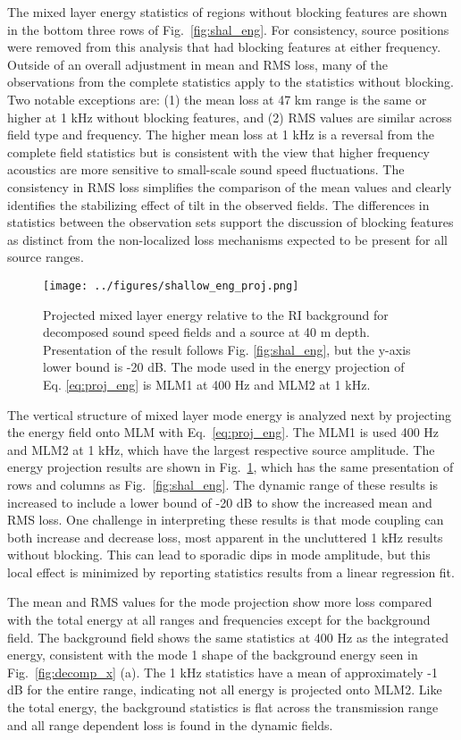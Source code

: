 \documentclass[preprint,NumberedRefs]{JASA}
\begin{document}
The mixed layer energy statistics of regions without blocking features are shown in the bottom three rows of Fig.~\ref{fig:shal_eng}. For consistency, source positions were removed from this analysis that had blocking features at either frequency. Outside of an overall adjustment in mean and RMS loss, many of the observations from the complete statistics apply to the statistics without blocking. Two notable exceptions are: (1) the mean loss at 47 km range is the same or higher at 1 kHz without blocking features, and (2) RMS values are similar across field type and frequency. The higher mean loss at 1 kHz is a reversal from the complete field statistics but is consistent with the view that higher frequency acoustics are more sensitive to small-scale sound speed fluctuations. The consistency in RMS loss simplifies the comparison of the mean values and clearly identifies the stabilizing effect of tilt in the observed fields. The differences in statistics between the observation sets support the discussion of blocking features as distinct from the non-localized loss mechanisms expected to be present for all source ranges.

\begin{figure}
\texttt{[image: ../figures/shallow\_eng\_proj.png]}
    \caption{Projected mixed layer energy relative to the RI background for decomposed sound speed fields and a source at 40 m depth. Presentation of the result follows Fig. \ref{fig:shal_eng}, but the y-axis lower bound is -20 dB. The mode used in the energy projection of Eq. \eqref{eq:proj_eng} is MLM1 at 400 Hz and MLM2 at 1 kHz.}
    \label{fig:shal_proj}
\end{figure}
The vertical structure of mixed layer mode energy is analyzed next by projecting the energy field onto MLM with Eq.~\eqref{eq:proj_eng}. The MLM1 is used 400 Hz and MLM2 at 1 kHz, which have the largest respective source amplitude. The energy projection results are shown in Fig.~\ref{fig:shal_proj}, which has the same presentation of rows and columns as Fig.~\ref{fig:shal_eng}. The dynamic range of these results is increased to include a lower bound of -20 dB to show the increased mean and RMS loss. One challenge in interpreting these results is that mode coupling can both increase and decrease loss, most apparent in the uncluttered 1 kHz results without blocking. This can lead to sporadic dips in mode amplitude, but this local effect is minimized by reporting statistics results from a linear regression fit.

The mean and RMS values for the mode projection show more loss compared with the total energy at all ranges and frequencies except for the background field. The background field shows the same statistics at 400 Hz as the integrated energy, consistent with the mode 1 shape of the background energy seen in Fig.~\ref{fig:decomp_x} (a). The 1 kHz statistics have a mean of approximately -1 dB for the entire range, indicating not all energy is projected onto MLM2. Like the total energy, the background statistics is flat across the transmission range and all range dependent loss is found in the dynamic fields.
\end{document}
